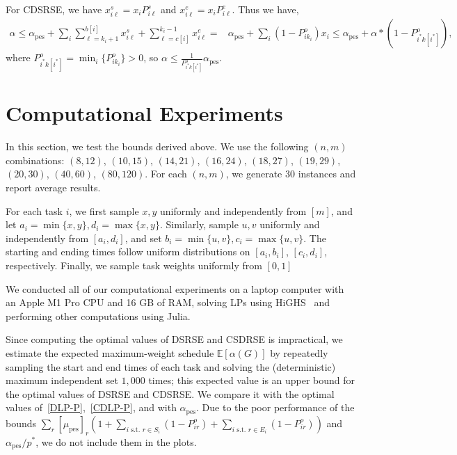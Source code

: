 \documentclass{article}
\newcommand{\E}{\mathbb{E}}
\DeclareMathOperator{\pes}{pes}
\begin{document}
For CDSRSE, we have 
$x_{i\ell}^{s}=x_i P_{i\ell}^s $ and $x_{i\ell}^{e}=x_i P_{i\ell}^e$.
Thus we have,
\begin{align*}
\alpha\leq \alpha_{\pes}+\sum_{i}\sum_{\ell=k_i+1}^{b[i]}x_{i\ell}^{s}+\sum_{\ell=c[i]}^{k_i-1}x_{i\ell}^{e} = &\alpha_{\pes}+\sum_{i}(1-P_{ik_i}^o)x_i
\leq \alpha_{\pes}+\alpha*(1-P_{i^*k[i^*]}^{o}),
\end{align*}
where $P_{i^*k[i^*]}^{o}=\min_i \{P_{ik_i}^o\}>0$, so 
\(\alpha\leq \frac{1}{P_{i^*k[i^*]}^{o}}\alpha_{\pes}.\)

\section{Computational Experiments}

In this section, we test the bounds derived above.
We use the following $(n,m)$ combinations: $(8,12)$, $(10,15)$, $(14,21)$, $(16,24)$, $(18,27)$, $(19,29)$, $(20,30)$, $(40,60)$, $(80,120)$.
For each $(n,m)$, we generate $30$ instances and report average results.  

For each task $i$, we first sample $x,y$ uniformly and independently from $[m]$, and let $a_i=\min\{x,y\},d_i=\max\{x,y\}$.
Similarly, sample $u,v$ uniformly and independently from $[a_i,d_i]$, and set $b_i = \min\{u,v\}, c_i=\max\{u,v\}$.
The starting and ending times follow uniform distributions on $[a_i,b_i]$, $[c_i,d_i]$, respectively. Finally, we sample task weights uniformly from $[0, 1]$

We conducted all of our computational experiments on a laptop computer with an Apple M1 Pro CPU and 16 GB of RAM, solving LPs using HiGHS~\cite{HiGHS} and performing
other computations using Julia.

Since computing the optimal values of DSRSE and CSDRSE is impractical, we estimate the expected maximum-weight schedule $\E[\alpha(G)]$ by repeatedly sampling the start and end times of each task and solving the (deterministic) maximum independent set $1,000$ times; this expected value is an upper bound for the optimal values of DSRSE and CDSRSE.
We compare it with the optimal values of~\eqref{DLP-P},~\eqref{CDLP-P}, and with 
$\alpha_\pes$.
Due to the poor performance of the bounds $\sum_r [\mu_{\pes}]_r\left(1+\sum_{i\text{ s.t. }r\in S_i} (1-P_{ir}^o)+\sum_{i\text{ s.t. }r\in E_i} (1-P_{ir}^o)\right)$ and $\alpha_\pes/p^*$, we do not include them in the plots.
\end{document}
